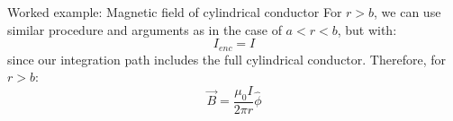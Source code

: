 {\begin{frame}{Worked example: Magnetic field of cylindrical conductor}
  For $r>b$, we can use similar procedure and arguments
  as in the case of $a<r<b$, but with:
  \begin{equation*}
     I_{enc} = I
  \end{equation*}
  since our integration path includes the full cylindrical conductor.
  Therefore, for $r>b$:
  \begin{equation*}
     \displaystyle
     \vec{B} = \frac{\mu_0 I}{2\pi r} \hat{\phi}
  \end{equation*}

\end{frame}

} %

